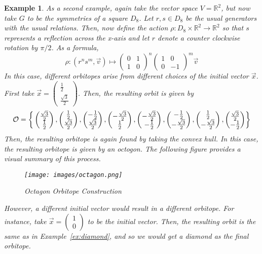 \documentclass[12]{amsart}
\newtheorem{example}[theorem]{Example}
\newcommand{\orb}[0]{\mathcal{O}}
\newcommand{\set}[1]{ \left\{ #1 \right\} }
\newcommand{\vecxx}[2]{\begin{pmatrix} #1 \\ #2 \end{pmatrix}}
\begin{document}
\begin{example}
	As a second example, again take the vector space $V = \mathbb{R}^2$, but now take $G$ to be the symmetries of a square $D_8$. Let $r,s \in D_8$ be the usual generators with the usual relations. Then, now define the action $\rho: D_8 \times \mathbb{R}^2 \to \mathbb{R}^2$ so that $s$ represents a reflection across the x-axis and let $r$ denote a counter clockwise rotation by $\pi/2$. As a formula,
	\begin{equation*}
		\rho: (r^n s^m, \vec{v}) \mapsto
		\begin{pmatrix} 0 & 1 \\ 1 & 0 \end{pmatrix}^n
		\begin{pmatrix} 1 & 0 \\ 0 & -1 \end{pmatrix}^m
		\vec{v}
	\end{equation*}
	In this case, different orbitopes arise from different choices of the initial vector $\vec{x}$. 
	First take $\vec{x} = \vecxx{\frac{1}{2}}{\frac{\sqrt{3}}{2}}$. Then, the resulting orbit is given by 
	$$\orb = \set{\\
	\vecxx{\frac{\sqrt{3}}{2}}{\frac{1}{2}}, 
	\vecxx{\frac{1}{2}}{\frac{\sqrt{3}}{2}}, 
	\vecxx{-\frac{1}{2}}{\frac{\sqrt{3}}{2}}, 
	\vecxx{-\frac{\sqrt{3}}{2}}{\frac{1}{2}}, 
	\vecxx{-\frac{\sqrt{3}}{2}}{-\frac{1}{2}}, 
	\vecxx{-\frac{1}{2}}{-\frac{\sqrt{3}}{2}}, 
	\vecxx{\frac{1}{2}}{-\frac{\sqrt{3}}{2}}, 
	\vecxx{\frac{\sqrt{3}}{2}}{-\frac{1}{2}}}$$
	Then, the resulting orbitope is again found by taking the convex hull. In this case, the resulting orbitope is given by an octogon. The following figure provides a visual summary of this process. 

	\begin{figure}[h!]
		\texttt{[image: images/octagon.png]}
		\caption{Octagon Orbitope Construction}
		\label{fig:octagon}
	\end{figure}		
	
	However, a different initial vector would result in a different orbitope. For instance, take $\vec{x} = \vecxx{1}{0}$ to be the initial vector. Then, the resulting orbit is the same as in Example~\ref{ex:diamond}, and so we would get a diamond as the final orbitope.
\end{example}
\end{document}
